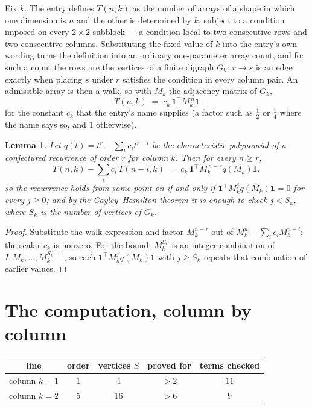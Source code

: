 \documentclass[11pt,a4paper]{article}
\theoremstyle{plain}
\newtheorem{lemma}[theorem]{Lemma}
\theoremstyle{definition}
\begin{document}
Fix $k$. The entry defines $T(n,k)$ as the number of arrays of a shape in which one dimension
is $n$ and the other is determined by $k$, subject to a condition imposed on every
$2\times2$ subblock --- a condition local to two consecutive rows and two consecutive columns.
Substituting the fixed value of $k$ into the entry's own wording turns the definition into an
ordinary one-parameter array count, and for such a count the rows are the vertices of a finite
digraph $G_k$: $r\to s$ is an edge exactly when placing $s$ under $r$ satisfies the condition
in every column pair. An admissible array is then a walk, so with $M_k$ the adjacency matrix
of $G_k$,
\[
T(n,k)\;=\;c_k\,\mathbf{1}^{\!\top}M_k^{\,n}\mathbf{1}
\]
for the constant $c_k$ that the entry's name supplies (a factor such as $\tfrac12$ or
$\tfrac14$ where the name says so, and $1$ otherwise).

\begin{lemma}\label{lem:crit}
Let $q(t)=t^{r}-\sum_i c_it^{r-i}$ be the characteristic polynomial of a conjectured
recurrence of order $r$ for column $k$. Then for every $n\ge r$,
\[
T(n,k)-\sum_i c_i\,T(n-i,k)\;=\;c_k\,\mathbf{1}^{\!\top}M_k^{\,n-r}q(M_k)\mathbf{1},
\]
so the recurrence holds from some point on if and only if
$\mathbf{1}^{\!\top}M_k^{j}q(M_k)\mathbf{1}=0$ for every $j\ge0$; and by the
Cayley--Hamilton theorem it is enough to check $j<S_k$, where $S_k$ is the number of vertices
of $G_k$.
\end{lemma}

\begin{proof}
Substitute the walk expression and factor $M_k^{n-r}$ out of $M_k^{n}-\sum_ic_iM_k^{n-i}$;
the scalar $c_k$ is nonzero. For the bound, $M_k^{S_k}$ is an integer combination of
$I,M_k,\dots,M_k^{S_k-1}$, so each $\mathbf{1}^{\!\top}M_k^{j}q(M_k)\mathbf{1}$ with
$j\ge S_k$ repeats that combination of earlier values.
\end{proof}

\section{The computation, column by column}

\begin{center}
\begin{tabular}{ccccc}
line & order & vertices $S$ & proved for & terms checked \\ \hline
column $k$$=1$ & $1$ & $4$ & $>2$ & $11$ \\
column $k$$=2$ & $5$ & $16$ & $>6$ & $9$ \\
\end{tabular}
\end{center}
\end{document}
